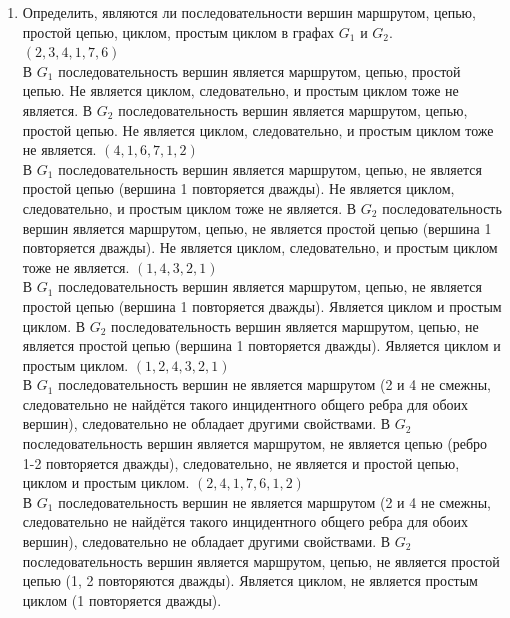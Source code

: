\documentclass[a4paper,14pt]{extarticle}
\begin{document}
\begin{enumerate}[1.]
\begin{center}
          \end{center}\bigbreak
          \item Определить, являются ли последовательности вершин маршрутом, цепью, 
          простой цепью, циклом, простым циклом в графах $G_1$ и $G_2$.\\

          $(2, 3, 4, 1, 7, 6)$\\
          В $G_1$ последовательность вершин является маршрутом, цепью, простой цепью. 
          Не является циклом, следовательно, и простым циклом тоже не является.
          В $G_2$ последовательность вершин является маршрутом, цепью, простой цепью. 
          Не является циклом, следовательно, и простым циклом тоже не является.\bigbreak
          $(4, 1, 6, 7, 1, 2)$\\
          В $G_1$ последовательность вершин является маршрутом, цепью, не является простой цепью (вершина 1 повторяется дважды). 
          Не является циклом, следовательно, и простым циклом тоже не является.
          В $G_2$ последовательность вершин является маршрутом, цепью, не является простой цепью (вершина 1 повторяется дважды). 
          Не является циклом, следовательно, и простым циклом тоже не является.\bigbreak
          $(1, 4, 3, 2, 1)$\\
          В $G_1$ последовательность вершин является маршрутом, цепью, не является простой цепью (вершина 1 повторяется дважды). 
          Является циклом и простым циклом.
          В $G_2$ последовательность вершин является маршрутом, цепью, не является простой цепью (вершина 1 повторяется дважды). 
          Является циклом и простым циклом.\bigbreak
          $(1, 2, 4, 3, 2, 1)$\\
          В $G_1$ последовательность вершин не является маршрутом (2 и 4 не смежны, следовательно не найдётся такого инцидентного общего ребра для обоих вершин), следовательно не обладает другими свойствами.
          В $G_2$ последовательность вершин является маршрутом, не является цепью (ребро 1-2 повторяется дважды), следовательно, не является и простой цепью, циклом и простым циклом. \bigbreak
          $(2, 4, 1, 7, 6, 1, 2)$\\
          В $G_1$ последовательность вершин не является маршрутом (2 и 4 не смежны, следовательно не найдётся такого инцидентного общего ребра для обоих вершин), следовательно не обладает другими свойствами.
          В $G_2$ последовательность вершин является маршрутом, цепью, не является простой цепью (1, 2 повторяются дважды). Является циклом, не является простым циклом (1 повторяется дважды). \bigbreak


\end{enumerate}
\end{document}
